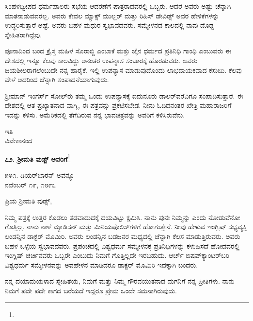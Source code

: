 ಸಿಂಹಳದ್ವೀಪದ ಧರ್ಮಪಾಲರು ಸಭೆಯ ಆದರಣೆಗೆ ಪಾತ್ರರಾದವರಲ್ಲಿ ಒಬ್ಬರು. ಆದರೆ ಅವರು ಅಷ್ಟು ಚೆನ್ನಾಗಿ ಮಾತನಾಡುವವರಲ್ಲ. ಅವರು ಕೇವಲ ಮ್ಯಾಕ್ಸ್ ಮುಲ್ಲರ್ ಮತ್ತು ರಿಹಿಸ್ ಡೇವಿಡ್ಸ್ ಅವರ ಹೇಳಿಕೆಗಳನ್ನು ಉದ್ಧರಿಸುತ್ತಾರೆ ಅಷ್ಟೆ. ಅವರು ಬಹಳ ಮಧುರ ಸ್ವಭಾವದವರು. ಸಮ್ಮೇಳನದ ಕಾಲದಲ್ಲಿ ನಾವು ದೊಡ್ಡ ಸ್ನೇಹಿತರಾಗಿದ್ದೆವು. 

ಪೂನಾದಿಂದ ಬಂದ ಕ್ರೈಸ್ತ ಮಹಿಳೆ ಸೊರಾಬ್ಜಿ ಎಂಬಾಕೆ ಮತ್ತು ಜೈನ ಧರ್ಮದ ಪ್ರತಿನಿಧಿ ಗಾಂಧಿ ಎಂಬುವರು ಈ ದೇಶದಲ್ಲಿ ಇನ್ನೂ ಕೆಲವು ಕಾಲವಿದ್ದು ಅನಂತರ ಉಪನ್ಯಾಸ ಸಂಚಾರಕ್ಕೆ ಹೊರಡುವರು. ಅವರು ಜಯಶೀಲರಾಗಲೆಂಬುದೇ ನನ್ನ ಹಾರೈಕೆ. ಇಲ್ಲಿ ಉಪನ್ಯಾಸ ಮಾಡುವುದೊಂದು ಲಾಭದಾಯಕವಾದ ಕಸುಬು. ಕೆಲವು ವೇಳೆ ಅದರಿಂದ ಚೆನ್ನಾಗಿ ಸಂಪಾದನೆಯಾಗುವುದು.

ಶ‍್ರೀಮಾನ್ ಇಂಗ‌ರ್ಸ್ ಸೋಲ್‌ರು ತಮ್ಮ ಒಂದು ಉಪನ್ಯಾಸಕ್ಕೆ ಐದುನೂರು ಡಾಲರ್‌ವರೆವಿಗೂ ಸಂಪಾದಿಸುತ್ತಾರೆ. ಈ ದೇಶದಲ್ಲಿ ಆತ ಪ್ರಖ್ಯಾತನಾದ ವಾಗ್ಮಿ, ಈ ಪತ್ರವನ್ನು ಪ್ರಕಟಿಸಬೇಡ. ನೀನು ಓದಿದನಂತರ ಖೇತ್ರಿ ಮಹಾರಾಜರಿಗೆ ಇದನ್ನು ಕಳಿಸು. ಅಮೆರಿಕದಲ್ಲಿ ತೆಗೆದಿರುವ ನನ್ನ ಭಾವಚಿತ್ರವನ್ನು ಅವರಿಗೆ ಕಳಿಸಿರುವೆನು.

\vspace{-0.5cm}

{\flushright
ಇತಿ\\ವಿವೇಕಾನಂದ\par}

\begin{center}
\textbf{೭೨. ಶ‍್ರೀಮತಿ ವುಡ್ಸ್ ಅವರಿಗೆ}\footnote{}
\end{center}

\vspace{-0.7cm}

\begin{flushright}
೫೪೧. ಡಿಯರ್‌ಬಾರನ್ ಅವನ್ಯೂ\\ನವೆಂಬರ್ ೧೯, ೧೮೯೩
\end{flushright}

\vspace{-0.5cm}

\noindent
ಪ್ರಿಯ ಶ‍್ರೀಮತಿ ವುಡ್ಸ್,

ನಿಮ್ಮ ಪತ್ರಕ್ಕೆ ಉತ್ತರ ಕೊಡಲು ತಡವಾದುದಕ್ಕೆ ದಯವಿಟ್ಟು ಕ್ಷಮಿಸಿ. ನಾನು ಪುನಃ ನಿಮ್ಮನ್ನು ಎಂದು ನೋಡುವೆನೋ ಗೊತ್ತಿಲ್ಲ. ನಾನು ನಾಳೆ ಮ್ಯಾಡಿಸನ್ ಮತ್ತು ಮಿನಿಯಪೊಲಿಸ್‌ಗಳಿಗೆ ಹೋಗುತ್ತೇನೆ. ನೀವು ಹೇಳುವ ಇಂಗ್ಲಿಷ್ ಸಭ್ಯವ್ಯಕ್ತಿ ಲಂಡನ್ನಿನ ಡಾಕ್ಟರ್ ಮೊಮಿರಿ. ಅವರು ಲಂಡನ್ನಿನ ಬಡಜನರ ಮಧ್ಯದಲ್ಲಿ ಚೆನ್ನಾಗಿ ಕೆಲಸ ಮಾಡುತ್ತಿರುವರು. ಅವರು ಬಹಳ ಒಳ್ಳೆಯ ಸ್ವಭಾವದವರು. ಪ್ರಪಂಚದಲ್ಲಿ ವಿಶ್ವಧರ್ಮ ಸಮ್ಮೇಳನಕ್ಕೆ ಪ್ರತಿನಿಧಿಗಳನ್ನು ಕಳುಹಿಸದೆ ಹೋದವರಲ್ಲಿ ಇಂಗ್ಲಿಷ್ ಚರ್ಚಿನವರು ಒಬ್ಬರೇ ಎಂಬುದು ನಿಮಗೆ ಗೊತ್ತಿಲ್ಲದೇ ಇರಬಹುದು. ಆರ್ಚ್ ಬಿಷಪ್‌ಕ್ಯಾಂಟರ್‌ಬರಿ ವಿಶ್ವಧರ್ಮ ಸಮ್ಮೇಳನವನ್ನು ಅವಹೇಳನ ಮಾಡಿದರೂ ಡಾಕ್ಟರ್ ಮೊಮಿರಿ ಇದಕ್ಕಾಗಿ ಬಂದರು.

ನನ್ನ ದಯಾಮಯಳಾದ ಸ್ನೇಹಿತೆಯೆ, ನಿಮಗೆ ಮತ್ತು ನಿಮ್ಮ ಗೌರವಯುತನಾದ ಮಗನಿಗೆ ನನ್ನ ಪ್ರೀತಿಗಳು. ನಾನು ನಿಮಗೆ ಪದೇ ಪದೇ ಕಾಗದ ಬರೆಯದೆ ಇದ್ದರೂ ಪ್ರೇಮ ಒಂದೇ ಸಮನಾಗಿರುವುದು.

